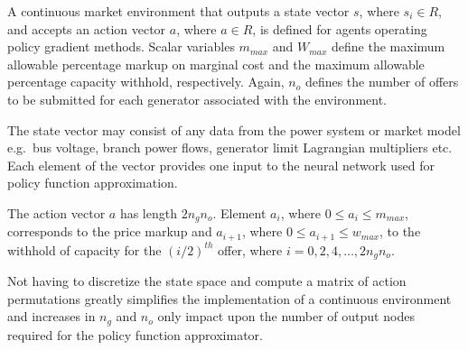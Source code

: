 
A continuous market environment that outputs a state vector $s$, where $s_i
\in R$, and accepts an action vector $a$, where $a\in R$, is defined for agents
operating policy gradient methods.  Scalar variables $m_{max}$ and
$W_{max}$ define the maximum allowable percentage markup on marginal cost and
the maximum allowable percentage capacity withhold, respectively.  Again, $n_o$
defines the number of offers to be submitted for each generator associated with
the environment.

The state vector may consist of any data from the power system or market model
e.g.~bus voltage, branch power flows, generator limit Lagrangian multipliers
etc.  Each element of the vector provides one input to the neural network used
for policy function approximation.

The action vector $a$ has length $2n_gn_o$.  Element $a_i$, where $0\leq a_i
\leq m_{max}$, corresponds to the price markup and $a_{i+1}$, where $0\leq
a_{i+1} \leq w_{max}$, to the withhold of capacity for the $(i/2)^{th}$ offer,
where $i=0,2,4,\dotsc,2n_gn_o$.

Not having to discretize the state space and compute a matrix of action
permutations greatly simplifies the implementation of a continuous environment
and increases in $n_g$ and $n_o$ only impact upon the number of output nodes
required for the policy function approximator.

